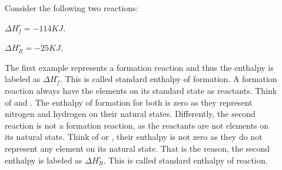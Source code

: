 \documentclass[main.tex]{subfiles}
\begin{document}
\begin{description}
\item[]
Consider the following two reactions:
\begin{center} \hspace*{0pt}\hfill $\Delta H^{\circ}_f=-114KJ$.\end{center}
\begin{center} \hspace*{0pt}\hfill $\Delta H^{\circ}_R=-25KJ$.\end{center}
The first example represents a formation reaction and thus the enthalpy is labeled as $\Delta H^{\circ}_f$. This is called standard enthalpy of formation. A formation reaction always have the elements on its standard state as reactants. Think of  and . The enthalpy of formation for both is zero as they represent nitrogen and hydrogen on their natural states. Differently, the second reaction is not a formation reaction, as the reactants are not elements on its natural state. Think of  or , their enthalpy is not zero as they do not represent any element on its natural state. That is the reason, the second enthalpy is labeled as $\Delta H^{\circ}_R$. This is called standard enthalpy of reaction.
  \end{description}
\end{document}
